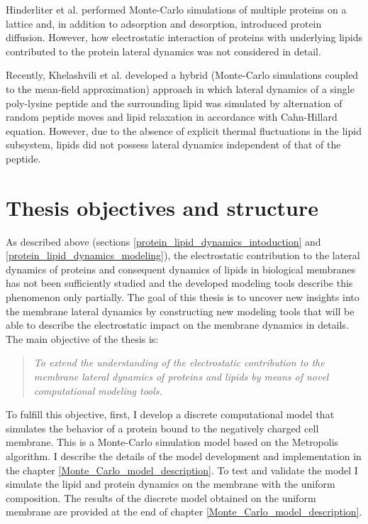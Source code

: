 Hinderliter et al. \cite{Hinderliter2001} performed Monte-Carlo simulations of multiple proteins on a lattice and, in addition to adsorption and desorption, introduced protein diffusion. However, how electrostatic interaction of proteins with underlying lipids contributed to the protein lateral dynamics was not considered in detail. 

Recently, Khelashvili et al. \cite{Khelashvili2008} developed a hybrid (Monte-Carlo simulations coupled to the mean-field approximation) approach in which lateral dynamics of a single poly-lysine peptide and the surrounding lipid was simulated by alternation of random peptide moves and lipid relaxation in accordance with Cahn-Hillard equation. However, due to the absence of explicit thermal fluctuations in the lipid subsystem, lipids did not possess lateral dynamics independent of that of the peptide.

\section{Thesis objectives and structure}

As described above (sections \ref{protein_lipid_dynamics_intoduction} and \ref{protein_lipid_dynamics_modeling}), the electrostatic contribution to the lateral dynamics of proteins and consequent dynamics of lipids in biological membranes has not been sufficiently studied and the developed modeling tools describe this phenomenon only partially. The goal of this thesis is to uncover new insights into the membrane lateral dynamics by constructing new modeling tools that will be able to describe the electrostatic impact on the membrane dynamics in details. The main objective of the thesis is:

\begin{quotation}
\begin{spacing}{1.0}
\emph{To extend the understanding of the electrostatic contribution to the membrane lateral dynamics of proteins and lipids by means of novel computational modeling tools.}
\end{spacing}
\end{quotation}

\vspace{-0.23in}

To fulfill this objective, first, I develop a discrete computational model that simulates the behavior of a protein bound to the negatively charged cell membrane. This is a Monte-Carlo simulation model based on the Metropolis algorithm. I describe the details of the model development and implementation in the chapter \ref{Monte_Carlo_model_description}. To test and validate the model I simulate the lipid and protein dynamics on the membrane with the uniform composition. The results of the discrete model obtained on the uniform membrane are provided at the end of chapter \ref{Monte_Carlo_model_description}.


